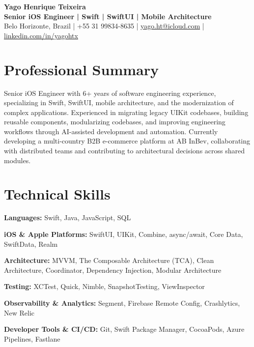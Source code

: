 \documentclass[10pt,a4paper]{article}
\begin{document}
\begin{center}
    {\Large\bfseries Yago Henrique Teixeira}\\[4pt]
    \textbf{Senior iOS Engineer | Swift | SwiftUI | Mobile Architecture}\\[4pt]
    Belo Horizonte, Brazil \quad | \quad +55 31 99834-8635 \quad | \quad
    \href{mailto:yago.ht@icloud.com}{yago.ht@icloud.com}
    \quad | \quad
    \href{https://linkedin.com/in/yagohtx}{linkedin.com/in/yagohtx}
\end{center}


\section{Professional Summary}

Senior iOS Engineer with 6+ years of software engineering experience, specializing in Swift, SwiftUI, mobile architecture, and the modernization of complex applications. Experienced in migrating legacy UIKit codebases, building reusable components, modularizing codebases, and improving engineering workflows through AI-assisted development and automation. Currently developing a multi-country B2B e-commerce platform at AB InBev, collaborating with distributed teams and contributing to architectural decisions across shared modules.


\section{Technical Skills}

\textbf{Languages:}
Swift, Java, JavaScript, SQL

\textbf{iOS \& Apple Platforms:}
SwiftUI, UIKit, Combine, async/await, Core Data, SwiftData, Realm

\textbf{Architecture:}
MVVM, The Composable Architecture (TCA), Clean Architecture, Coordinator, Dependency Injection, Modular Architecture

\textbf{Testing:}
XCTest, Quick, Nimble, SnapshotTesting, ViewInspector

\textbf{Observability \& Analytics:}
Segment, Firebase Remote Config, Crashlytics, New Relic

\textbf{Developer Tools \& CI/CD:}
Git, Swift Package Manager, CocoaPods, Azure Pipelines, Fastlane
\end{document}
